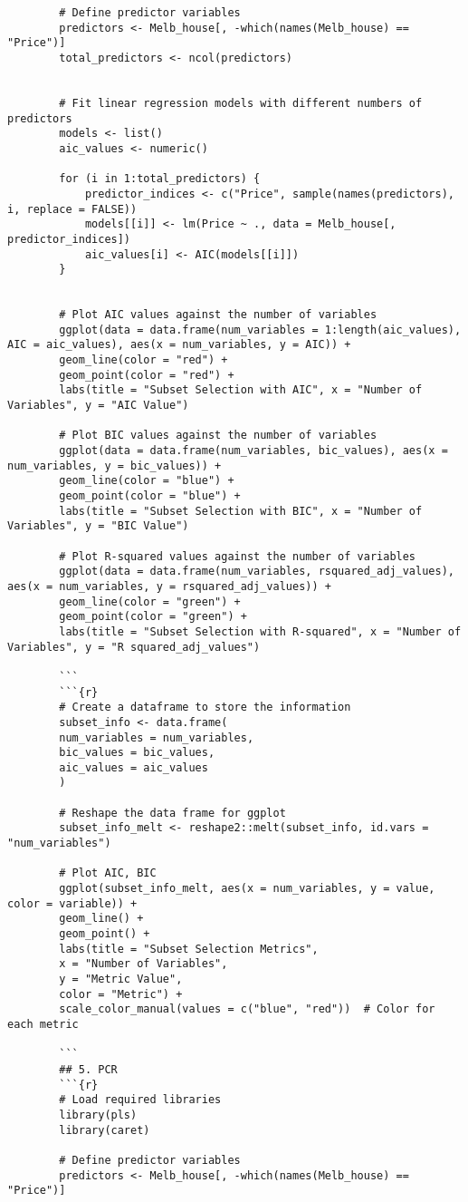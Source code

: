 \documentclass[12pt,doublespace]{article}
\begin{document}
\begin{lstlisting}
		# Define predictor variables
		predictors <- Melb_house[, -which(names(Melb_house) == "Price")]
		total_predictors <- ncol(predictors)
		
		
		# Fit linear regression models with different numbers of predictors
		models <- list()
		aic_values <- numeric()
		
		for (i in 1:total_predictors) {  
			predictor_indices <- c("Price", sample(names(predictors), i, replace = FALSE))
			models[[i]] <- lm(Price ~ ., data = Melb_house[, predictor_indices])
			aic_values[i] <- AIC(models[[i]])
		}
		
		
		# Plot AIC values against the number of variables
		ggplot(data = data.frame(num_variables = 1:length(aic_values), AIC = aic_values), aes(x = num_variables, y = AIC)) +
		geom_line(color = "red") +
		geom_point(color = "red") +
		labs(title = "Subset Selection with AIC", x = "Number of Variables", y = "AIC Value")
		
		# Plot BIC values against the number of variables
		ggplot(data = data.frame(num_variables, bic_values), aes(x = num_variables, y = bic_values)) +
		geom_line(color = "blue") +
		geom_point(color = "blue") +
		labs(title = "Subset Selection with BIC", x = "Number of Variables", y = "BIC Value")
		
		# Plot R-squared values against the number of variables
		ggplot(data = data.frame(num_variables, rsquared_adj_values), aes(x = num_variables, y = rsquared_adj_values)) +
		geom_line(color = "green") +
		geom_point(color = "green") +
		labs(title = "Subset Selection with R-squared", x = "Number of Variables", y = "R squared_adj_values")
		
		```
		```{r}
		# Create a dataframe to store the information
		subset_info <- data.frame(
		num_variables = num_variables,
		bic_values = bic_values,
		aic_values = aic_values
		)
		
		# Reshape the data frame for ggplot
		subset_info_melt <- reshape2::melt(subset_info, id.vars = "num_variables")
		
		# Plot AIC, BIC
		ggplot(subset_info_melt, aes(x = num_variables, y = value, color = variable)) +
		geom_line() +
		geom_point() +
		labs(title = "Subset Selection Metrics",
		x = "Number of Variables",
		y = "Metric Value",
		color = "Metric") +
		scale_color_manual(values = c("blue", "red"))  # Color for each metric
		
		```
		## 5. PCR
		```{r}
		# Load required libraries
		library(pls)
		library(caret)
		
		# Define predictor variables
		predictors <- Melb_house[, -which(names(Melb_house) == "Price")]
		

\end{lstlisting}
\end{document}

